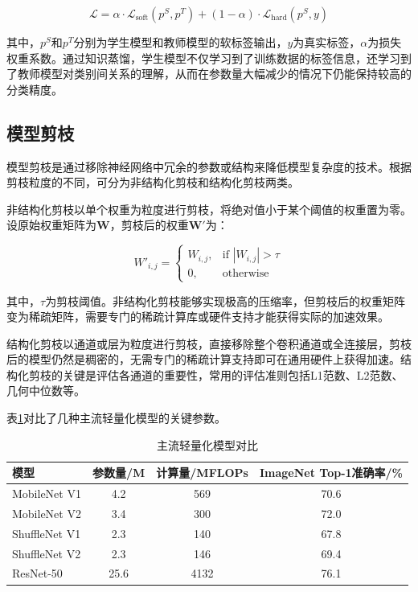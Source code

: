 \begin{equation}
	\mathcal{L} = \alpha \cdot \mathcal{L}_{\text{soft}}(p^S, p^T) + (1 - \alpha) \cdot \mathcal{L}_{\text{hard}}(p^S, y)
	\label{eq:distillation_loss}
\end{equation}

其中，$p^S$和$p^T$分别为学生模型和教师模型的软标签输出，$y$为真实标签，$\alpha$为损失权重系数。通过知识蒸馏，学生模型不仅学习到了训练数据的标签信息，还学习到了教师模型对类别间关系的理解，从而在参数量大幅减少的情况下仍能保持较高的分类精度。

\subsection{模型剪枝}

模型剪枝是通过移除神经网络中冗余的参数或结构来降低模型复杂度的技术\cite{han2015deep}。根据剪枝粒度的不同，可分为非结构化剪枝和结构化剪枝两类。

非结构化剪枝以单个权重为粒度进行剪枝，将绝对值小于某个阈值的权重置为零。设原始权重矩阵为$\mathbf{W}$，剪枝后的权重$\mathbf{W}'$为：

\begin{equation}
	W'_{i,j} = \begin{cases} W_{i,j}, & \text{if } |W_{i,j}| > \tau \\ 0, & \text{otherwise} \end{cases}
	\label{eq:pruning}
\end{equation}

其中，$\tau$为剪枝阈值。非结构化剪枝能够实现极高的压缩率，但剪枝后的权重矩阵变为稀疏矩阵，需要专门的稀疏计算库或硬件支持才能获得实际的加速效果。

结构化剪枝以通道或层为粒度进行剪枝，直接移除整个卷积通道或全连接层，剪枝后的模型仍然是稠密的，无需专门的稀疏计算支持即可在通用硬件上获得加速。结构化剪枝的关键是评估各通道的重要性，常用的评估准则包括L1范数、L2范数、几何中位数等。

表\ref{tab:lightweight}对比了几种主流轻量化模型的关键参数。

\begin{table}[htbp]
	\centering
	\caption{主流轻量化模型对比}
	\label{tab:lightweight}
	\begin{tabular}{lccc}
		\toprule
		模型 & 参数量/M & 计算量/MFLOPs & ImageNet Top-1准确率/\% \\
		\midrule
		MobileNet V1\cite{howard2017mobilenets} & 4.2 & 569 & 70.6 \\
		MobileNet V2 & 3.4 & 300 & 72.0 \\
		ShuffleNet V1 & 2.3 & 140 & 67.8 \\
		ShuffleNet V2 & 2.3 & 146 & 69.4 \\
		ResNet-50\cite{he2016deep} & 25.6 & 4132 & 76.1 \\
		\bottomrule
	\end{tabular}
\end{table}

